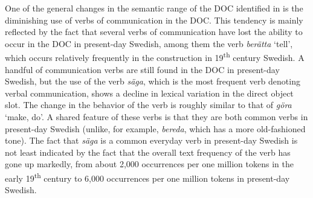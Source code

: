 \documentclass[output=paper]{langscibook}
\begin{document}
\label{sec:valdeson:5.3.1.4}\largerpage[-1]
One of the general changes in the semantic range of the DOC identified in \textcite{ValdesonSubmitted} is the diminishing use of verbs of communication in the DOC. This tendency is mainly reflected by the fact that several verbs of communication have lost the ability to occur in the DOC in present-day Swedish, among them the verb \textit{berätta} ‘tell’, which occurs relatively frequently in the construction in 19\textsuperscript{th} century Swedish. A handful of communication verbs are still found in the DOC in present-day Swedish, but the use of the verb \textit{säga}, which is the most frequent verb denoting verbal communication, shows a decline in lexical variation in the direct object slot. The change in the behavior of the verb is roughly similar to that of \textit{göra} ‘make, do’. A shared feature of these verbs is that they are both common verbs in present-day Swedish (unlike, for example, \textit{bereda}, which has a more old-fashioned tone). The fact that \textit{säga} is a common everyday verb in present-day Swedish is not least indicated by the fact that the overall text frequency of the verb has gone up markedly, from about 2,000 occurrences per one million tokens in the early 19\textsuperscript{th} century to 6,000 occurrences per one million tokens in present-day Swedish.


\begin{table}
\caption{Frequency measures of the verb-specific DOC with \textit{säga} ‘say, tell’}
\label{tab:valdeson:11}
\end{table}
\end{document}
